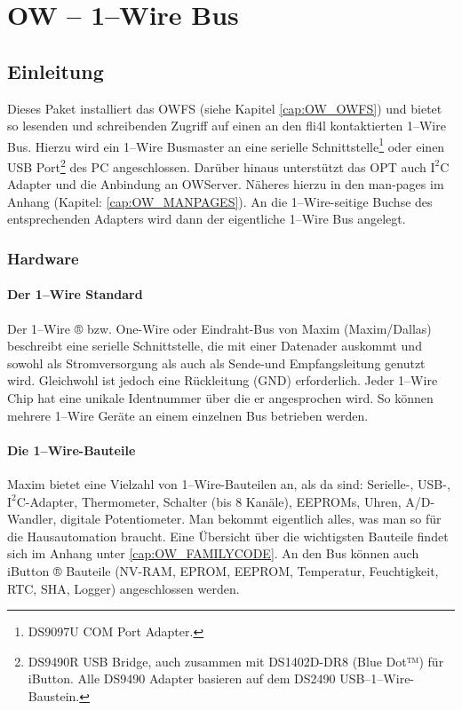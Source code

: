 {
\section {OW -- 1--Wire Bus}
}
\setcounter{secnumdepth}{6}

\newcommand{\IsqC}{$\textrm{I}^{\textrm{2}}\textrm{C}$}
\newcommand{\isqc}{$\textrm{i}^{\textrm{2}}\textrm{c}$}

\subsection{Einleitung}

Dieses Paket installiert das OWFS (siehe Kapitel \ref{cap:OW_OWFS}) und bietet so lesenden und
schreibenden Zugriff auf einen an den fli4l kontaktierten 1--Wire Bus. Hierzu wird ein
1--Wire Busmaster an eine serielle Schnittstelle\footnote{DS9097U COM Port
Adapter.} oder einen USB Port\footnote{DS9490R USB Bridge, auch zusammen mit
DS1402D-DR8 (Blue Dot™) für iButton. Alle DS9490 Adapter basieren auf dem
DS2490 USB--1--Wire-Baustein.} des PC angeschlossen.
Darüber hinaus unterstützt das OPT auch \IsqC{} Adapter und die Anbindung
an OWServer. Näheres hierzu in den man-pages im Anhang (Kapitel:
\ref{cap:OW_MANPAGES}). An die 1--Wire-seitige
Buchse des entsprechenden Adapters wird dann der eigentliche 1--Wire Bus angelegt.

\subsubsection{Hardware}
\paragraph{Der 1--Wire Standard}
Der 1--Wire ® bzw. One-Wire oder Eindraht-Bus von Maxim (Maxim/Dallas) beschreibt
eine serielle Schnittstelle, die mit einer Datenader auskommt und sowohl als
Stromversorgung als auch als Sende-und Empfangsleitung genutzt wird. Gleichwohl
ist jedoch eine \glqq{}Rückleitung\grqq{} (GND) erforderlich. Jeder 1--Wire Chip hat eine unikale
Identnummer über die er angesprochen wird. So können mehrere 1--Wire Geräte an
einem einzelnen Bus betrieben werden.

\paragraph{Die 1--Wire-Bauteile}
Maxim bietet eine Vielzahl von 1--Wire-Bauteilen an, als da sind: Serielle-, USB-,
\IsqC-Adapter,
Thermometer, Schalter (bis 8 Kanäle), EEPROMs, Uhren, A/D-Wandler,
digitale Potentiometer. Man bekommt eigentlich alles, was man so für die Hausautomation
braucht. Eine Übersicht über die wichtigsten Bauteile findet sich im Anhang
unter \ref{cap:OW_FAMILYCODE}.
An den Bus können auch iButton ® Bauteile (NV-RAM, EPROM, EEPROM, Temperatur,
Feuchtigkeit, RTC, SHA, Logger) angeschlossen werden.

